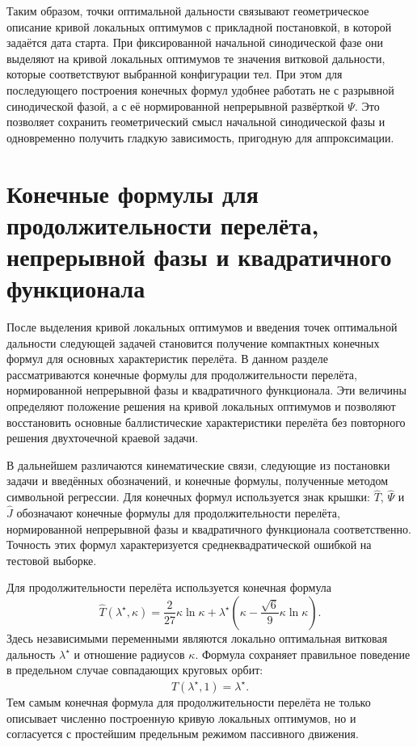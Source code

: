 Таким образом, точки оптимальной дальности связывают геометрическое описание кривой локальных оптимумов с прикладной постановкой, в которой задаётся дата старта. При фиксированной начальной синодической фазе они выделяют на кривой локальных оптимумов те значения витковой дальности, которые соответствуют выбранной конфигурации тел. При этом для последующего построения конечных формул удобнее работать не с разрывной синодической фазой, а с её нормированной непрерывной развёрткой $\Psi$. Это позволяет сохранить геометрический смысл начальной синодической фазы и одновременно получить гладкую зависимость, пригодную для аппроксимации.


\section{Конечные формулы для продолжительности перелёта, непрерывной фазы и квадратичного функционала}

После выделения кривой локальных оптимумов и введения точек оптимальной дальности следующей задачей становится получение компактных конечных формул для основных характеристик перелёта. В данном разделе рассматриваются конечные формулы для продолжительности перелёта, нормированной непрерывной фазы и квадратичного функционала. Эти величины определяют положение решения на кривой локальных оптимумов и позволяют восстановить основные баллистические характеристики перелёта без повторного решения двухточечной краевой задачи.

В дальнейшем различаются кинематические связи, следующие из постановки задачи и введённых обозначений, и конечные формулы, полученные методом символьной регрессии. Для конечных формул используется знак крышки: $\widehat{T}$, $\widehat{\Psi}$ и $\widehat{J}$ обозначают конечные формулы для продолжительности перелёта, нормированной непрерывной фазы и квадратичного функционала соответственно. Точность этих формул характеризуется среднеквадратической ошибкой на тестовой выборке.

Для продолжительности перелёта используется конечная формула
\begin{equation}
	\widehat{T}\left(\lambda^\star,\kappa\right)=
	\frac{2}{27}\kappa\ln\kappa
	+
	\lambda^\star
	\left(
	\kappa-\frac{\sqrt6}{9}\kappa\ln\kappa
	\right).
\end{equation}
Здесь независимыми переменными являются локально оптимальная витковая дальность $\lambda^\star$ и отношение радиусов $\kappa$. Формула сохраняет правильное поведение в предельном случае совпадающих круговых орбит:
\begin{equation}
	\widehat{T}\left(\lambda^\star,1\right)=\lambda^\star .
\end{equation}
Тем самым конечная формула для продолжительности перелёта не только описывает численно построенную кривую локальных оптимумов, но и согласуется с простейшим предельным режимом пассивного движения.

